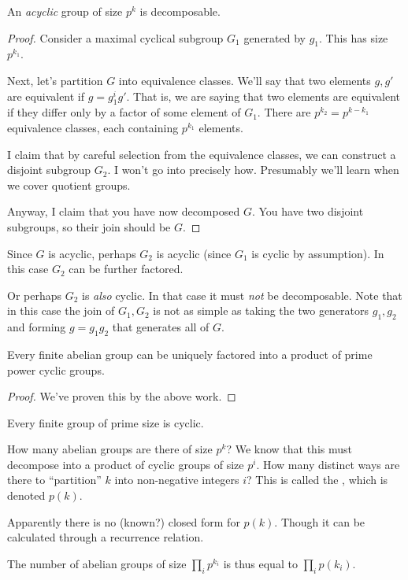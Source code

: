 \begin{theorem}
  An \emph{acyclic} group of size $p^k$ is decomposable.
\end{theorem}

\begin{proof}
  Consider a maximal cyclical subgroup $G_1$ generated by $g_1$. This
  has size $p^{k_1}$.

  Next, let's partition $G$ into equivalence classes. We'll say that two
  elements $g, g'$ are equivalent if $g = g_1^i g'$. That is, we are
  saying that two elements are equivalent if they differ only by a
  factor of some element of $G_1$. There are $p^{k_2} = p^{k - k_1}$
  equivalence classes, each containing $p^{k_1}$ elements.

  I claim that by careful selection from the equivalence classes, we can
  construct a disjoint subgroup $G_2$. I won't go into precisely how.
  Presumably we'll learn when we cover quotient groups.

  Anyway, I claim that you have now decomposed $G$. You have two
  disjoint subgroups, so their join should be $G$.
\end{proof}

\begin{remark}
  Since $G$ is acyclic, perhaps $G_2$ is acyclic (since $G_1$ is cyclic
  by assumption). In this case $G_2$ can be further factored.

  Or perhaps $G_2$ is \emph{also} cyclic. In that case it must
  \emph{not} be decomposable. Note that in this case the join of $G_1,
  G_2$ is not as simple as taking the two generators $g_1, g_2$ and
  forming $g = g_1 g_2$ that generates all of $G$.
\end{remark}

\begin{theorem}

  Every finite abelian group can be uniquely factored into a product of
  prime power cyclic groups.
\end{theorem}

\begin{proof}
  We've proven this by the above work.
\end{proof}

\begin{corollary}
  Every finite group of prime size is cyclic.
\end{corollary}

\begin{remark}
  How many abelian groups are there of size $p^k$? We know that this
  must decompose into a product of cyclic groups of size $p^i$. How many
  distinct ways are there to ``partition'' $k$ into non-negative
  integers $i$? This is called the , which is
  denoted $p(k)$.

  Apparently there is no (known?) closed form for $p(k)$. Though it can
  be calculated through a recurrence relation.
\end{remark}

\begin{remark}
  The number of abelian groups of size $\prod_i p^{k_i}$ is thus equal
  to $\prod_i p(k_i)$.
\end{remark}
